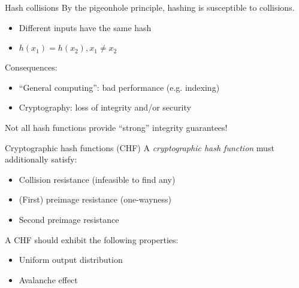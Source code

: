 \begin{frame}{Hash collisions}
  By the pigeonhole principle, hashing is susceptible to collisions.
  \begin{itemize}[<+(1)->]
    \item Different inputs have the same hash
    \item $h(x_1) = h(x_2), x_1 \neq x_2$
  \end{itemize}

  \vspace*{1em}

  \pause
  Consequences:
  \begin{itemize}[<+(1)->]
    \item \enquote{General computing}: bad performance (e.g. indexing)
    \item Cryptography: loss of integrity and/or security
  \end{itemize}

  \vspace*{1em}

  \pause
  Not all hash functions provide \enquote{strong} integrity guarantees!
\end{frame}

\begin{frame}{Cryptographic hash functions (CHF)}
  A \emph{cryptographic hash function} must additionally satisfy:
  \begin{itemize}[<+(1)->]
    \item Collision resistance (infeasible to find any)
    \item (First) preimage resistance (one-wayness)
    \item Second preimage resistance
  \end{itemize}

  \vspace*{1em}

  \pause
  A CHF should exhibit the following properties:
  \begin{itemize}[<+(1)->]
    \item Uniform output distribution
    \item Avalanche effect
  \end{itemize}
\end{frame}

